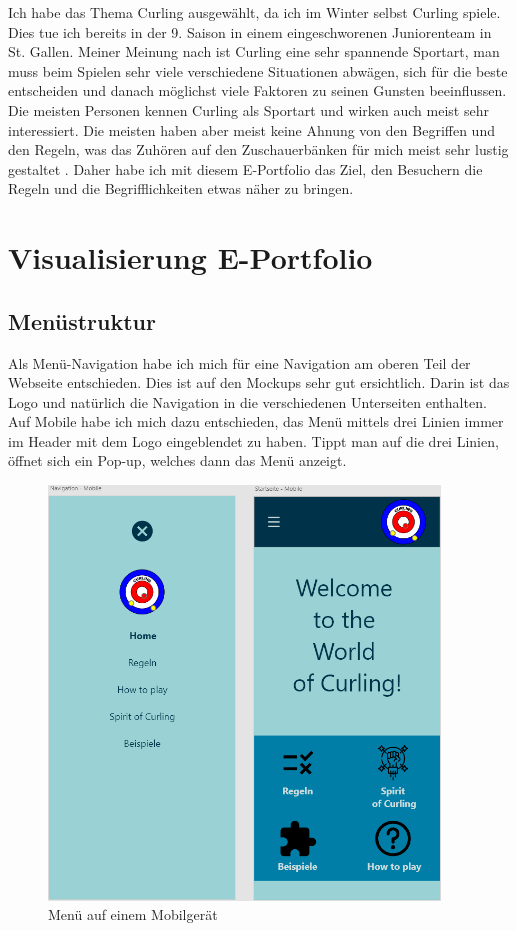 \documentclass[11pt]{article}
\begin{document}
    Ich habe das Thema Curling ausgewählt, da ich im Winter selbst Curling spiele. Dies tue ich bereits in der
    9. Saison in einem eingeschworenen Juniorenteam in St. Gallen.
    Meiner Meinung nach ist Curling eine sehr spannende Sportart, man muss beim Spielen sehr viele verschiedene
    Situationen abwägen, sich für die beste entscheiden und danach möglichst viele Faktoren zu seinen Gunsten
    beeinflussen. \\
    Die meisten Personen kennen Curling als Sportart und wirken auch meist sehr interessiert. Die meisten haben
    aber meist keine Ahnung von den Begriffen und den Regeln, was das Zuhören auf den Zuschauerbänken für mich
    meist sehr lustig gestaltet \smiley. Daher habe ich mit diesem E-Portfolio das Ziel, den Besuchern
    die Regeln und die Begrifflichkeiten etwas näher zu bringen.

    \section{Visualisierung E-Portfolio}

    \subsection{Menüstruktur}
    Als Menü-Navigation habe ich mich für eine Navigation am oberen Teil der Webseite entschieden. Dies ist
    auf den Mockups sehr gut ersichtlich. Darin ist das Logo und natürlich die Navigation in die verschiedenen
    Unterseiten enthalten.\\
    Auf Mobile habe ich mich dazu entschieden, das Menü mittels drei Linien immer im Header mit dem Logo
    eingeblendet zu haben. Tippt man auf die drei Linien, öffnet sich ein Pop-up, welches dann das Menü anzeigt.

    \begin{figure}[h]
        \centering
        \includegraphics[height=11cm]{media/menu_mobile}
        \caption{Menü auf einem Mobilgerät}
    \end{figure}
\end{document}

